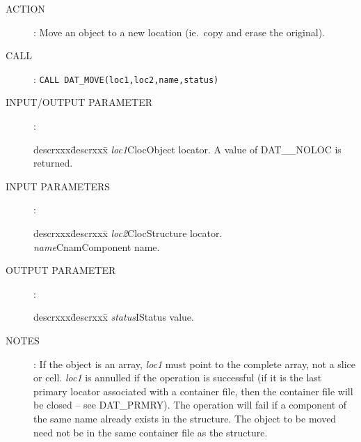 \begin{description}
\item [ACTION]:
Move an object to a new location (ie.\ copy and erase the original).
\item [CALL]:
{\tt CALL DAT\_MOVE(loc1,loc2,name,status)}
\item [INPUT/OUTPUT PARAMETER]:
\begin{tabbing}
descrxxx\=descrxxx\=\kill
{\em loc1}\>Cloc\>Object locator. A value of DAT\_\_NOLOC is returned.
\end{tabbing}
\item [INPUT PARAMETERS]:
\begin{tabbing}
descrxxx\=descrxxx\=\kill
{\em loc2}\>Cloc\>Structure locator.\\
{\em name}\>Cnam\>Component name.
\end{tabbing}
\item [OUTPUT PARAMETER]:
\begin{tabbing}
descrxxx\=descrxxx\=\kill
{\em status}\>I\>Status value.
\end{tabbing}
\item [NOTES]:
If the object is an array, {\em loc1} must point to the complete array, not a
slice or cell. {\em loc1} is annulled if the operation is successful (if it is
the last primary locator associated with a container file, then the container
file will be closed -- see DAT\_PRMRY). The operation will fail if a component
of the same name already exists in the structure. The object to be moved need
not be in the same container file as the structure.
\end{description}
\goodbreak


